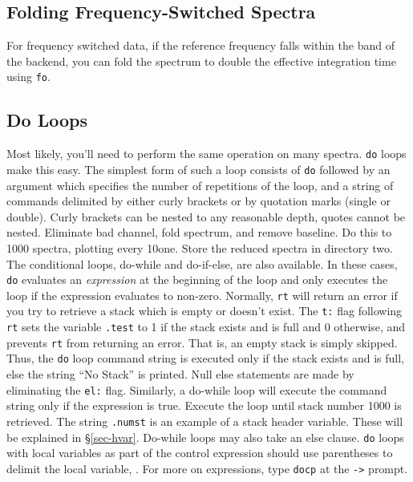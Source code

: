 \subsection{Folding Frequency-Switched Spectra}

For frequency switched data, if the reference frequency falls within the
band of the backend, you can fold the spectrum to double the effective
integration time using {\tt fo}.
\smallskip
{}
 
\subsection{Do Loops}
\label{sec-do}
 
Most likely, you'll need to perform the same operation on many spectra.  {\tt do}
loops make this easy. The simplest form of such a loop consists of 
{\tt do} followed by an argument which specifies the number 
of repetitions of the loop, 
and a string of commands delimited by either curly brackets 
or by quotation marks (single or double).  
Curly brackets can be nested to any reasonable depth, quotes cannot be nested.  
\smallskip
{}
				{Eliminate bad channel, fold spectrum, and 
                                remove baseline. Do this to 1000 spectra, plotting 
                                every 10\uth one.  
				Store the reduced spectra in directory two.}
\smallskip\noindent
The conditional loops, do-while and do-if-else, are also available. 
In these cases, {\tt do} evaluates an {\it expression\/} at the beginning 
of the loop and only executes the loop if the expression evaluates to non-zero.
\smallskip
{}
\smallskip\noindent
Normally, {\tt rt} will return an error if you try to retrieve 
a stack which is empty or doesn't exist. 
The {\tt t:} flag following {\tt rt} sets the variable {\tt .test} to 1 if the
stack exists and is full and 0 otherwise, and prevents {\tt rt} from 
returning an error. That is, an empty stack is simply skipped. 
Thus, the {\tt do} loop command 
string  is executed only if the stack exists and is full, 
else the string ``No Stack'' is printed.
Null else statements are made by eliminating the {\tt el:} flag.
Similarly, a do-while loop will execute the command string only if the
expression is true.
\smallskip
{}
{Execute the loop until stack number 1000 is retrieved.}
\smallskip\noindent
The string {\tt .numst} is an example of a stack header variable. These
will be explained in \S\ref{sec-hvar}.
Do-while loops may also take an else clause.
{\tt do} loops with local variables as part of the control expression should
use parentheses to delimit the local variable, 
.
For more on expressions, type {\tt docp} at the {\tt ->} prompt.

